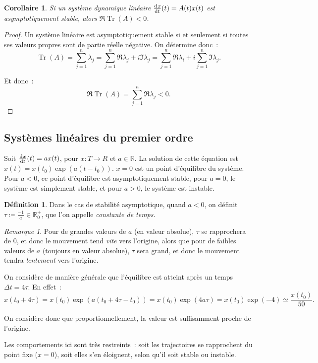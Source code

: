 \documentclass{article}
\newtheorem{cor}[thm]{Corollaire}
\theoremstyle{definition}
\newtheorem{déf}[thm]{Définition}
\theoremstyle{remark}
\newtheorem*{rmq}{Remarque}
\DeclareMathOperator{\Tr}{Tr}
\newcommand{\R}{\mathbb R}
\begin{document}
	\begin{cor} Si un système dynamique linéaire $\od xt(t) = A(t)x(t)$ est asymptotiquement stable, alors $\Re\Tr(A) < 0$.
	\end{cor}

	\begin{proof} Un système linéaire est asymptotiquement stable si et seulement si toutes ses valeurs propres sont de partie réelle négative.
	On détermine donc~:
	\[\Tr(A) = \sum_{j=1}^n\lambda_j = \sum_{j=1}^n\Re\lambda_j + i\Im\lambda_j = \sum_{j=1}^n\Re\lambda_i + i\sum_{j=1}^n\Im\lambda_j.\]

	Et donc~:
	\[\Re\Tr(A) = \sum_{j=1}^n\Re\lambda_j < 0.\]
	\end{proof}

	\subsection{Systèmes linéaires du premier ordre}

	Soit $\od xt(t) = ax(t)$, pour $x : T \to R$ et $a \in \R$. La solution de cette équation est $x(t) = x(t_0)\exp(a(t-t_0))$. $x=0$ est un point d'équilibre du
	système. Pour $a < 0$, ce point d'équilibre est asymptotiquement stable, pour $a=0$, le système est simplement stable, et pour $a > 0$, le système est
	instable.

	\begin{déf} Dans le cas de stabilité asymptotique, quand $a < 0$, on définit $\tau \coloneqq \frac {-1}a \in \R_0^+$, que l'on appelle
	\textit{constante de temps}.
	\end{déf}

	\begin{rmq} Pour de grandes valeurs de $a$ (en valeur absolue), $\tau$ se rapprochera de 0, et donc le mouvement tend \textit{vite} vers l'origine, alors
	que pour de faibles valeurs de $a$ (toujours en valeur absolue), $\tau$ sera grand, et donc le mouvement tendra \textit{lentement} vers l'origine.

	On considère de manière générale que l'équilibre est atteint après un temps $\Delta t = 4\tau$. En effet~:
	\[x(t_0 + 4\tau) = x(t_0)\exp(a(t_0+4\tau-t_0)) = x(t_0)\exp(4a\tau) = x(t_0)\exp(-4) \simeq \frac {x(t_0)}{50}.\]

	On considère donc que proportionnellement, la valeur est suffisamment proche de l'origine.
	\end{rmq}

	Les comportements ici sont très restreints~: soit les trajectoires se rapprochent du point fixe ($x=0$), soit elles s'en éloignent, selon qu'il soit stable
	ou instable.
\end{document}
